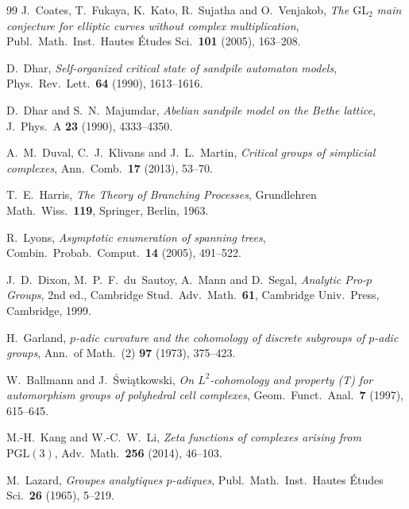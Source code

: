 \begin{thebibliography}{99}
 J.~Coates, T.~Fukaya, K.~Kato, R.~Sujatha and O.~Venjakob, \emph{The $\mathrm{GL}_2$ main conjecture for elliptic curves without complex multiplication}, Publ.\ Math.\ Inst.\ Hautes \'Etudes Sci.\ \textbf{101} (2005), 163--208. 

 D.~Dhar, \emph{Self-organized critical state of sandpile automaton models}, Phys.\ Rev.\ Lett.\ \textbf{64} (1990), 1613--1616. 

 D.~Dhar and S.~N.~Majumdar, \emph{Abelian sandpile model on the Bethe lattice}, J.\ Phys.\ A \textbf{23} (1990), 4333--4350. 

 A.~M.~Duval, C.~J.~Klivans and J.~L.~Martin, \emph{Critical groups of simplicial complexes}, Ann.\ Comb.\ \textbf{17} (2013), 53--70. 

 T.~E.~Harris, \emph{The Theory of Branching Processes}, Grundlehren Math.\ Wiss.\ \textbf{119}, Springer, Berlin, 1963. 

 R.~Lyons, \emph{Asymptotic enumeration of spanning trees}, Combin.\ Probab.\ Comput.\ \textbf{14} (2005), 491--522. 

 J.~D.~Dixon, M.~P.~F.~du~Sautoy, A.~Mann and D.~Segal, \emph{Analytic Pro-$p$ Groups}, 2nd ed., Cambridge Stud.\ Adv.\ Math.\ \textbf{61}, Cambridge Univ.\ Press, Cambridge, 1999. 

 H.~Garland, \emph{$p$-adic curvature and the cohomology of discrete subgroups of $p$-adic groups}, Ann.\ of Math.\ (2) \textbf{97} (1973), 375--423. 

 W.~Ballmann and J.~\'Swi\k{a}tkowski, \emph{On $L^{2}$-cohomology and property (T) for automorphism groups of polyhedral cell complexes}, Geom.\ Funct.\ Anal.\ \textbf{7} (1997), 615--645. 

 M.-H.~Kang and W.-C.~W.~Li, \emph{Zeta functions of complexes arising from $\mathrm{PGL}(3)$}, Adv.\ Math.\ \textbf{256} (2014), 46--103. 

 M.~Lazard, \emph{Groupes analytiques $p$-adiques}, Publ.\ Math.\ Inst.\ Hautes \'Etudes Sci.\ \textbf{26} (1965), 5--219. 


\end{thebibliography}

